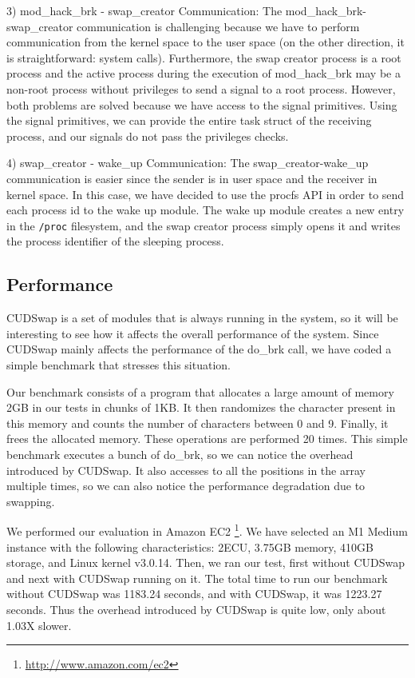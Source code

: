 3) mod\_hack\_brk - swap\_creator Communication: The mod\_hack\_brk-swap\_creator
communication is challenging because we have to perform communication from the
kernel space to the user space (on the other direction, it is straightforward: system
calls). Furthermore, the swap creator process is a root process and the active
process during the execution of mod\_hack\_brk may be a non-root process without
privileges to send a signal to a root process. However, both problems are solved
because we have access to the signal primitives. Using the signal primitives, we
can provide the entire task struct of the receiving process, and our signals do not
pass the privileges checks.

4) swap\_creator - wake\_up Communication: The swap\_creator-wake\_up communication
is easier since the sender is in user space and the receiver in kernel space. In
this case, we have decided to use the procfs API in order to send each process
id to the wake up module. The wake up module creates a new entry in the \texttt{/proc}
filesystem, and the swap creator process simply opens it and writes the process
identifier of the sleeping process.

\subsection{Performance}\label{subme_perf}

CUDSwap is a set of modules that is always running in the system, so it will be
interesting to see how it affects the overall performance of the system. Since
CUDSwap mainly affects the performance of the do\_brk call, we have coded a simple
benchmark that stresses this situation.

Our benchmark consists of a program that allocates a large amount of memory 2GB in
our tests in chunks of 1KB. It then randomizes the character present in this memory
and counts the number of characters between 0 and 9. Finally, it frees the allocated
memory. These operations are performed 20 times. This simple benchmark executes a bunch
of do\_brk, so we can notice the overhead introduced by CUDSwap. It also accesses to
all the positions in the array multiple times, so we can also notice the performance
degradation due to swapping.

We performed our evaluation in Amazon EC2 \footnote{\url{ http://www.amazon.com/ec2}}. We have selected an M1 Medium instance
with the following characteristics: 2ECU, 3.75GB memory, 410GB storage, and Linux
kernel v3.0.14. Then, we ran our test, first without CUDSwap and next with CUDSwap
running on it. The total time to run our benchmark without CUDSwap was 1183.24 seconds,
and with CUDSwap, it was 1223.27 seconds. Thus the overhead introduced by CUDSwap is quite
low, only about 1.03X slower.


